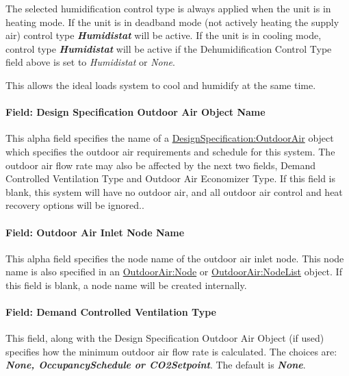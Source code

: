 The selected humidification control type is always applied when the unit is in heating mode. If the unit is in deadband mode (not actively heating the supply air) control type \textbf{\emph{Humidistat}} will be active. If the unit is in cooling mode, control type \textbf{\emph{Humidistat}} will be active if the Dehumidification Control Type field above is set to \emph{Humidistat} or \emph{None}.

This allows the ideal loads system to cool and humidify at the same time.

\paragraph{Field: Design Specification Outdoor Air Object Name}\label{field-design-specification-outdoor-air-object-name-002}

This alpha field specifies the name of a \hyperref[designspecificationoutdoorair]{DesignSpecification:OutdoorAir} object which specifies the outdoor air requirements and schedule for this system. The outdoor air flow rate may also be affected by the next two fields, Demand Controlled Ventilation Type and Outdoor Air Economizer Type. If this field is blank, this system will have no outdoor air, and all outdoor air control and heat recovery options will be ignored..

\paragraph{Field: Outdoor Air Inlet Node Name}\label{field-outdoor-air-inlet-node-name-002}

This alpha field specifies the node name of the outdoor air inlet node. This node name is also specified in an \hyperref[outdoorairnode]{OutdoorAir:Node} or \hyperref[outdoorairnodelist]{OutdoorAir:NodeList} object. If this field is blank, a node name will be created internally.

\paragraph{Field: Demand Controlled Ventilation Type}\label{field-demand-controlled-ventilation-type-000}

This field, along with the Design Specification Outdoor Air Object (if used) specifies how the minimum outdoor air flow rate is calculated. The choices are: \textbf{\emph{None, OccupancySchedule or CO2Setpoint}}. The default is \textbf{\emph{None}}.

